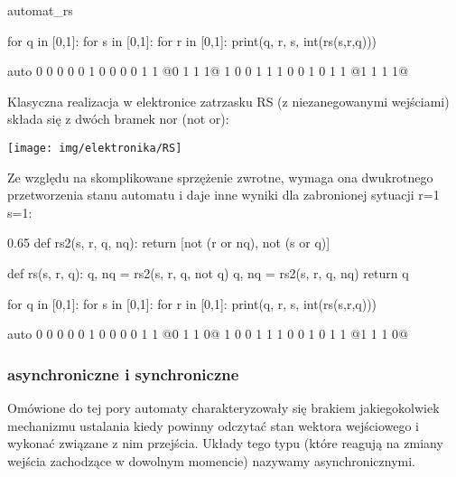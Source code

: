 \documentclass{pdfBooklets}
\begin{document}
\begin{Zadanie}{}{automat_rs}
\begin{teacherOnly}
\begin{CodeFrame}[python]{0.65\textwidth}
for q in [0,1]:
  for s in [0,1]:
    for r in [0,1]:
      print(q, r, s, int(rs(s,r,q)))
\end{CodeFrame}
\begin{CodeFrame}[text][escapeinside=@@]{auto}
0 0 0 0
0 1 0 0
0 0 1 1
@\textcolor{xgray}{0 1 1 1}@
1 0 0 1
1 1 0 0
1 0 1 1
@\textcolor{xgray}{1 1 1 1}@
\end{CodeFrame}
\end{teacherOnly}

\begin{teacherOnly}
\textcolor{\FSTop{colors}}{}
Klasyczna realizacja w elektronice zatrzasku RS (z niezanegowanymi wejściami) składa się z dwóch bramek nor (not or):

\begin{center}
\texttt{[image: img/elektronika/RS]}
\end{center}

Ze względu na skomplikowane sprzężenie zwrotne, wymaga ona dwukrotnego przetworzenia stanu automatu i daje inne wyniki dla zabronionej sytuacji r=1 s=1:

\begin{CodeFrame}[python][]{0.65\textwidth}
def rs2(s, r, q, nq):
	return [not (r or nq), not (s or q)]

def rs(s, r, q):
	q, nq = rs2(s, r, q, not q)
	q, nq = rs2(s, r, q, nq)
	return q

for q in [0,1]:
  for s in [0,1]:
    for r in [0,1]:
      print(q, r, s, int(rs(s,r,q)))
\end{CodeFrame}
\begin{CodeFrame}[text][escapeinside=@@]{auto}
0 0 0 0
0 1 0 0
0 0 1 1
@\textcolor{xgray}{0 1 1 0}@
1 0 0 1
1 1 0 0
1 0 1 1
@\textcolor{xgray}{1 1 1 0}@
\end{CodeFrame}
\end{teacherOnly}
\end{Zadanie}

\subsubsection{asynchroniczne i synchroniczne}

Omówione do tej pory automaty charakteryzowały się brakiem jakiegokolwiek mechanizmu ustalania kiedy powinny odczytać stan wektora wejściowego i wykonać związane z nim przejścia.
Układy tego typu (które reagują na zmiany wejścia zachodzące w dowolnym momencie) nazywamy asynchronicznymi.
\end{document}
